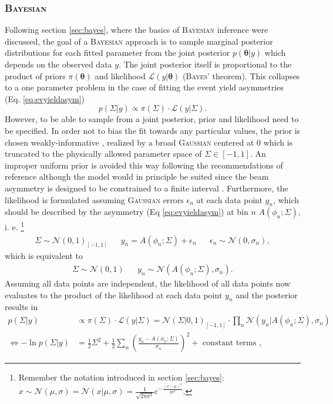 \subsubsection{\textsc{Bayesian}}
Following section \ref{sec:bayes}, where the basics of \textsc{Bayesian} inference were discussed, the goal of a \textsc{Bayesian} approach is to sample marginal posterior distributions for each fitted parameter from the joint posterior $p(\boldsymbol{\theta}|y)$ which depends on the observed data $y$. The joint posterior itself is proportional to the product of priors $\pi(\boldsymbol{\theta})$ and likelihood $\mathcal{L}(y|\boldsymbol{\theta})$ (\textsc{Bayes'} theorem). This collapses to a one parameter problem in the case of fitting the event yield asymmetries (Eq. \eqref{eq:evyieldasym})
\begin{equation}
	p(\Sigma|y)\propto \pi({\Sigma})\cdot \mathcal{L}(y|\Sigma).
\end{equation}
However, to be able to sample from a joint posterior, prior and likelihood need to be specified. In order not to bias the fit towards any particular values, the prior is chosen weakly-informative \cite{bayes}, realized by a broad \textsc{Gaussian} centered at 0 which is truncated to the physically allowed parameter space of $\Sigma\in[-1,1]$. An improper uniform prior is avoided this way following the recommendations of reference \cite{standevs} although the model would in principle be suited since the beam asymmetry is designed to be constrained to a finite interval \cite{standevs}. Furthermore, the likelihood is formulated assuming \textsc{Gaussian} errors $\epsilon_n$ at each data point $y_n$, which should be described by the asymmetry (Eq \eqref{eq:evyieldasym}) at bin $n$ $A(\phi_n;\Sigma)$, i. e. \footnote{Remember the notation introduced in section \ref{sec:bayes}: $x\sim\mathcal{N}(\mu,\sigma)=\mathcal{N}(x|\mu,\sigma)=\frac{1}{\sqrt{2\pi\sigma^2}}e^{-\frac{(x-\mu)^2}{2\sigma^2}}$.}
\begin{align}
	\Sigma \sim \mathcal{N}\left(0,1\right)_{[-1,1]} && y_n=A\left(\phi_n;\Sigma\right)+\epsilon_n && \epsilon_n\sim\mathcal{N}\left(0,\sigma_n\right),
\end{align}
which is equivalent to
\begin{align}
	 \Sigma \sim \mathcal{N}(0,1) &&y_n\sim\mathcal{N}\left(A(\phi_n;\Sigma),\sigma_n\right).
\end{align}
Assuming all data points are independent, the likelihood of all data points now evaluates to the product of the likelihood at each data point $y_n$ and the posterior results in \begin{align}
	p(\Sigma|y)&\propto\pi(\Sigma)\cdot\mathcal{L}(y|\Sigma)=\mathcal{N}\left(\Sigma|0,1\right)_{[-1,1]}\cdot\prod_{n}\mathcal{N}\left(y_n|A\left(\phi_n;\Sigma\right),\sigma_n\right)\\
	\Leftrightarrow -\ln p(\Sigma|y)&=\frac{1}{2}\Sigma^2+\frac{1}{2}\sum_{n}\left(\frac{y_n-A\left(\phi_n;\Sigma\right)}{\sigma_n}\right)^2+\text{ constant terms }, 
\end{align}
